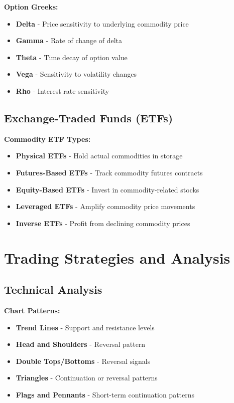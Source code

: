 \documentclass[12pt]{article}
\begin{document}
\textbf{Option Greeks:}
\begin{itemize}
    \item \textbf{Delta} - Price sensitivity to underlying commodity price
    \item \textbf{Gamma} - Rate of change of delta
    \item \textbf{Theta} - Time decay of option value
    \item \textbf{Vega} - Sensitivity to volatility changes
    \item \textbf{Rho} - Interest rate sensitivity
\end{itemize}

\subsection{Exchange-Traded Funds (ETFs)}

\textbf{Commodity ETF Types:}
\begin{itemize}
    \item \textbf{Physical ETFs} - Hold actual commodities in storage
    \item \textbf{Futures-Based ETFs} - Track commodity futures contracts
    \item \textbf{Equity-Based ETFs} - Invest in commodity-related stocks
    \item \textbf{Leveraged ETFs} - Amplify commodity price movements
    \item \textbf{Inverse ETFs} - Profit from declining commodity prices
\end{itemize}

\section{Trading Strategies and Analysis}

\subsection{Technical Analysis}

\textbf{Chart Patterns:}
\begin{itemize}
    \item \textbf{Trend Lines} - Support and resistance levels
    \item \textbf{Head and Shoulders} - Reversal pattern
    \item \textbf{Double Tops/Bottoms} - Reversal signals
    \item \textbf{Triangles} - Continuation or reversal patterns
    \item \textbf{Flags and Pennants} - Short-term continuation patterns
\end{itemize}
\end{document}
